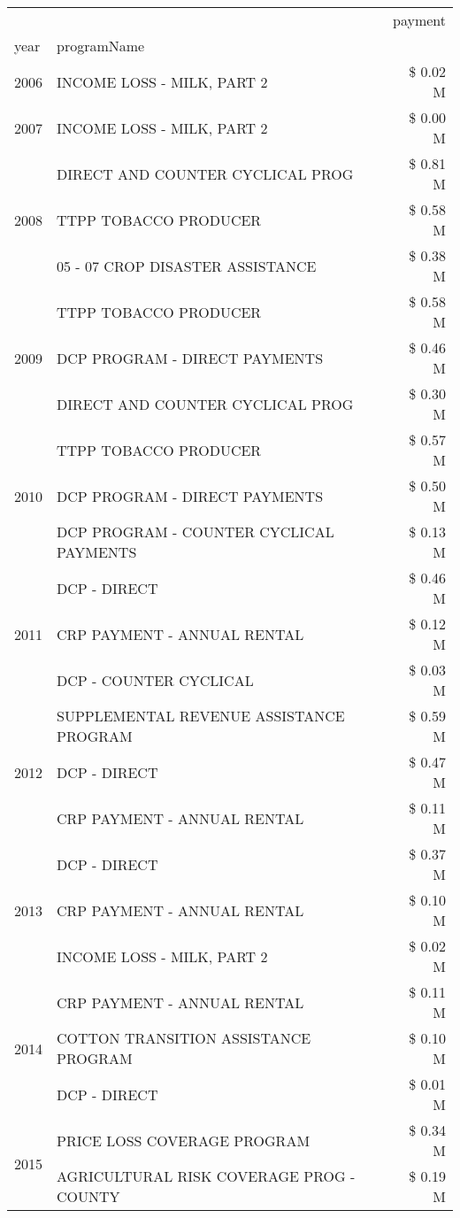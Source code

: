 \begin{tabular}{llr}
\toprule
 &  & payment \\
year & programName &  \\
\midrule
2006 & INCOME LOSS - MILK, PART 2 & \$ 0.02 M \\
\cline{1-3}
2007 & INCOME LOSS - MILK, PART 2 & \$ 0.00 M \\
\cline{1-3}
\multirow[t]{3}{*}{2008} & DIRECT AND COUNTER CYCLICAL PROG & \$ 0.81 M \\
 & TTPP TOBACCO PRODUCER & \$ 0.58 M \\
 & 05 - 07 CROP DISASTER ASSISTANCE & \$ 0.38 M \\
\cline{1-3}
\multirow[t]{3}{*}{2009} & TTPP TOBACCO PRODUCER & \$ 0.58 M \\
 & DCP PROGRAM - DIRECT PAYMENTS & \$ 0.46 M \\
 & DIRECT AND COUNTER CYCLICAL PROG & \$ 0.30 M \\
\cline{1-3}
\multirow[t]{3}{*}{2010} & TTPP TOBACCO PRODUCER & \$ 0.57 M \\
 & DCP PROGRAM - DIRECT PAYMENTS & \$ 0.50 M \\
 & DCP PROGRAM - COUNTER CYCLICAL PAYMENTS & \$ 0.13 M \\
\cline{1-3}
\multirow[t]{3}{*}{2011} & DCP - DIRECT & \$ 0.46 M \\
 & CRP PAYMENT - ANNUAL RENTAL & \$ 0.12 M \\
 & DCP - COUNTER CYCLICAL & \$ 0.03 M \\
\cline{1-3}
\multirow[t]{3}{*}{2012} & SUPPLEMENTAL REVENUE ASSISTANCE PROGRAM & \$ 0.59 M \\
 & DCP - DIRECT & \$ 0.47 M \\
 & CRP PAYMENT - ANNUAL RENTAL & \$ 0.11 M \\
\cline{1-3}
\multirow[t]{3}{*}{2013} & DCP - DIRECT & \$ 0.37 M \\
 & CRP PAYMENT - ANNUAL RENTAL & \$ 0.10 M \\
 & INCOME LOSS - MILK, PART 2 & \$ 0.02 M \\
\cline{1-3}
\multirow[t]{3}{*}{2014} & CRP PAYMENT - ANNUAL RENTAL & \$ 0.11 M \\
 & COTTON TRANSITION ASSISTANCE PROGRAM & \$ 0.10 M \\
 & DCP - DIRECT & \$ 0.01 M \\
\cline{1-3}
\multirow[t]{3}{*}{2015} & PRICE LOSS COVERAGE PROGRAM & \$ 0.34 M \\
 & AGRICULTURAL RISK COVERAGE PROG - COUNTY & \$ 0.19 M \\

\end{tabular}
